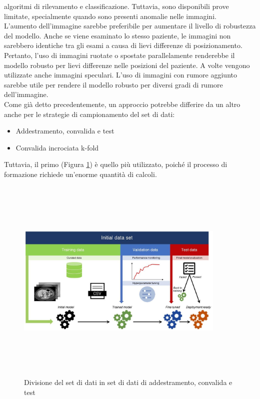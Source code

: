 \documentclass[12pt,a4paper]{report}
\begin{document}
algoritmi di rilevamento e classificazione. Tuttavia, sono disponibili prove limitate, specialmente quando sono presenti anomalie nelle immagini.\\
L'aumento dell'immagine sarebbe preferibile per aumentare il livello di robustezza del modello.
Anche se viene esaminato lo stesso paziente, le immagini non sarebbero identiche tra gli esami a causa di lievi differenze di posizionamento. 
Pertanto, l'uso di immagini ruotate o spostate parallelamente renderebbe il modello robusto per lievi differenze nelle posizioni del paziente. A volte vengono utilizzate anche immagini speculari. L'uso di immagini con rumore aggiunto sarebbe utile per rendere il modello robusto per diversi gradi di rumore dell'immagine.\\

Come già detto precedentemente, un approccio potrebbe differire da un altro anche per le strategie di campionamento del set di dati:
\begin{itemize}
    \item Addestramento, convalida e test
    \item Convalida incrociata k-fold
\end{itemize}
Tuttavia, il primo (Figura \ref{fig:data-sampling-radiology}) è quello più utilizzato, poiché il processo di formazione richiede un'enorme quantità di calcoli.\\

\begin{figure}[h!]
    \begin{center}
        \includegraphics[width=10cm,height=10cm,keepaspectratio]{Data_radiology}
    \end{center}
    \caption{Divisione del set di dati in set di dati di addestramento, convalida e test}
    \label{fig:data-sampling-radiology}
\end{figure}
\end{document}
